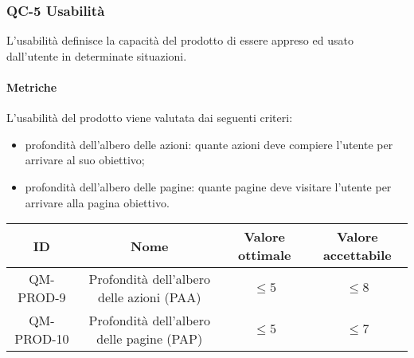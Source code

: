 \subsubsection{QC-5 Usabilità}
L'usabilità definisce la capacità del prodotto di essere appreso ed usato dall'utente in determinate situazioni.

	\paragraph{Metriche}
	L'usabilità del prodotto viene valutata dai seguenti criteri:
	\begin{itemize}
		\item profondità dell'albero delle azioni: quante azioni deve compiere l'utente per arrivare al suo obiettivo;
		\item profondità dell'albero delle pagine: quante pagine deve visitare l'utente per arrivare alla pagina obiettivo.
	\end{itemize}
	\begin{center}
		\begin{tabular}{|c|c|c|c|}
			\rowcolor{lighter-grayer}
			\hline
			ID & Nome & Valore ottimale & Valore accettabile \\
			\hline
			QM-PROD-9 & Profondità dell'albero delle azioni (PAA) & \(\le 5\) & \(\le 8\) \\
			\hline
			QM-PROD-10 & Profondità dell'albero delle pagine (PAP) & \(\le 5\) & \(\le 7\) \\
			\hline
		\end{tabular}
	\end{center}
